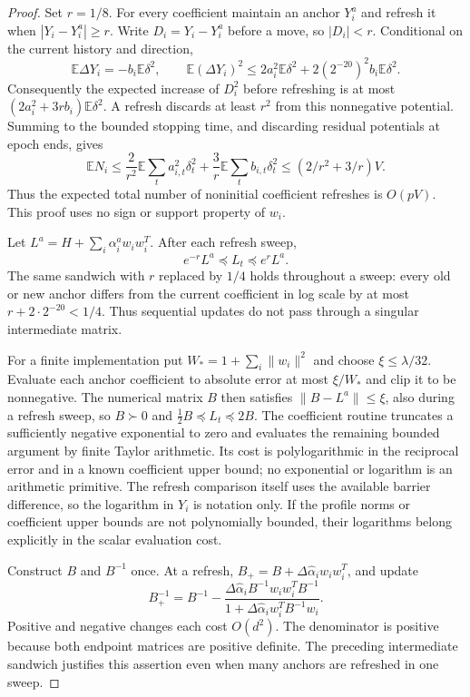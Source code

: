 \documentclass[11pt]{amsart}
\theoremstyle{definition}\newtheorem{definition}[theorem]{Definition}
\theoremstyle{remark}\newtheorem{remark}[theorem]{Remark}
\numberwithin{equation}{section}
\begin{document}
\begin{proof}
Set $r=1/8$. For every coefficient maintain an anchor $Y_i^a$ and
refresh it when $|Y_i-Y_i^a|\ge r$. Write $D_i=Y_i-Y_i^a$ before a
move, so $|D_i|<r$. Conditional on the current history and direction,
\[
 \mathbb E\Delta Y_i=-b_i\mathbb E\delta^2,\qquad
 \mathbb E(\Delta Y_i)^2
 \le2a_i^2\mathbb E\delta^2+2(2^{-20})^2b_i\mathbb E\delta^2.
\]
Consequently the expected increase of $D_i^2$ before refreshing is at
most $(2a_i^2+3rb_i)\mathbb E\delta^2$. A refresh discards at least
$r^2$ from this nonnegative potential. Summing to the bounded stopping
time, and discarding residual potentials at epoch ends, gives
\[
 \mathbb E N_i\le \frac{2}{r^2}\mathbb E\sum_ta_{i,t}^2\delta_t^2
       +\frac{3}{r}\mathbb E\sum_tb_{i,t}\delta_t^2
 \le (2/r^2+3/r)V.
\]
Thus the expected total number of noninitial coefficient refreshes is
$O(pV)$. This proof uses no sign or support property of $w_i$.

Let $L^a=H+\sum_i\alpha_i^a w_iw_i^T$. After each refresh sweep,
\[
 e^{-r}L^a\preceq L_t\preceq e^rL^a.
\]
The same sandwich with $r$ replaced by $1/4$ holds throughout a sweep:
every old or new anchor differs from the current coefficient in log
scale by at most $r+2\cdot2^{-20}<1/4$. Thus sequential updates do not
pass through a singular intermediate matrix.

For a finite implementation put
$W_*=1+\sum_i\|w_i\|^2$ and choose $\xi\le\lambda/32$.
Evaluate each anchor coefficient to absolute error at most $\xi/W_*$
and clip it to be nonnegative. The numerical matrix $B$ then satisfies
$\|B-L^a\|\le\xi$, also during a refresh sweep, so $B\succ0$ and
$\tfrac12 B\preceq L_t\preceq2B$.
The coefficient routine truncates a sufficiently negative exponential
to zero and evaluates the remaining bounded argument by finite Taylor
arithmetic. Its cost is polylogarithmic in the reciprocal error and in
a known coefficient upper bound; no exponential or logarithm is an
arithmetic primitive. The refresh comparison itself uses the available
barrier difference, so the logarithm in $Y_i$ is notation only. If the
profile norms or coefficient upper bounds are not polynomially bounded,
their logarithms belong explicitly in the scalar evaluation cost.

Construct $B$ and $B^{-1}$ once. At a refresh,
$B_+=B+\Delta\widehat\alpha_i w_iw_i^T$, and update
\[
 B_+^{-1}=B^{-1}-
 \frac{\Delta\widehat\alpha_i B^{-1}w_iw_i^TB^{-1}}
 {1+\Delta\widehat\alpha_i w_i^TB^{-1}w_i}.
\]
Positive and negative changes each cost $O(d^2)$. The denominator is
positive because both endpoint matrices are positive definite.
The preceding intermediate sandwich justifies this assertion even
when many anchors are refreshed in one sweep.


\end{proof}
\end{document}
